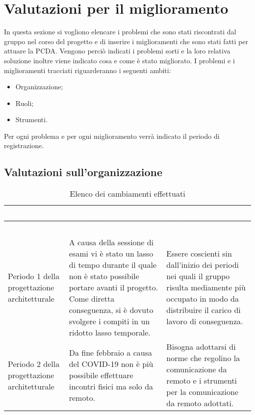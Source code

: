 \clearpage
\section{Valutazioni per il miglioramento}
In questa sezione si vogliono elencare i problemi che sono stati riscontrati dal gruppo nel corso del progetto e di inserire i miglioramenti che sono stati fatti per attuare la PCDA. Vengono perciò indicati i problemi sorti e la loro relativa soluzione inoltre viene indicato cosa e come è stato migliorato.
I problemi e i miglioramenti tracciati riguarderanno i seguenti ambiti:
\begin{itemize}
\item Organizzazione;
\item Ruoli;
\item Strumenti.
\end{itemize}
Per ogni problema e per ogni miglioramento verrà indicato il periodo di registrazione.

\subsection{Valutazioni sull'organizzazione}
{
	\renewcommand{\arraystretch}{1.5}
	\centering
	\begin{longtable}{ C{3cm} C{5.5cm} C{5.5cm}}
		\caption{Elenco dei cambiamenti effettuati}\\
		\textcolor{white}{\textbf{Periodo}} & \textcolor{white}{\textbf{Problema}} & \textcolor{white}{\textbf{Soluzione}}\\
		\endfirsthead
		\textcolor{white}{\textbf{Periodo}} & \textcolor{white}{\textbf{Problema}} & \textcolor{white}{\textbf{Soluzione}}\\
		\endhead
		Periodo 1 della progettazione architetturale & A causa della sessione di esami vi è stato un lasso di tempo durante il quale non è stato possibile portare avanti il progetto. Come diretta conseguenza, si è dovuto svolgere i compiti in un ridotto lasso temporale. & Essere coscienti sin dall'inizio dei periodi nei quali il gruppo risulta mediamente più occupato in modo da distribuire il carico di lavoro di conseguenza. \\
		
		Periodo 2 della progettazione architetturale & Da fine febbraio a causa del COVID-19 non è più possibile effettuare incontri fisici ma solo da remoto. & Bisogna adottarsi di norme che regolino la comunicazione da remoto e i strumenti per la comunicazione da remoto adottati. \\
		
	\end{longtable}
}


